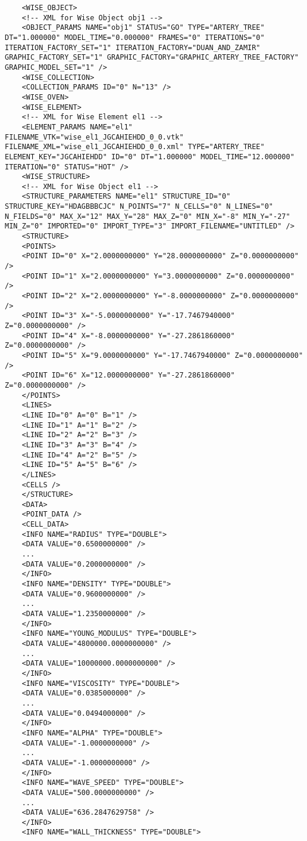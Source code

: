 \begin{appendices}
	\lstset{language=XML}
	\begin{lstlisting}
	<WISE_OBJECT>
	<!-- XML for Wise Object obj1 -->
	<OBJECT_PARAMS NAME="obj1" STATUS="GO" TYPE="ARTERY_TREE" DT="1.000000" MODEL_TIME="0.000000" FRAMES="0" ITERATIONS="0" ITERATION_FACTORY_SET="1" ITERATION_FACTORY="DUAN_AND_ZAMIR" GRAPHIC_FACTORY_SET="1" GRAPHIC_FACTORY="GRAPHIC_ARTERY_TREE_FACTORY" GRAPHIC_MODEL_SET="1" />
	<WISE_COLLECTION>
	<COLLECTION_PARAMS ID="0" N="13" />
	<WISE_OVEN>
	<WISE_ELEMENT>
	<!-- XML for Wise Element el1 -->
	<ELEMENT_PARAMS NAME="el1" FILENAME_VTK="wise_el1_JGCAHIEHDD_0_0.vtk" FILENAME_XML="wise_el1_JGCAHIEHDD_0_0.xml" TYPE="ARTERY_TREE" ELEMENT_KEY="JGCAHIEHDD" ID="0" DT="1.000000" MODEL_TIME="12.000000" ITERATION="0" STATUS="HOT" />
	<WISE_STRUCTURE>
	<!-- XML for Wise Object el1 -->
	<STRUCTURE_PARAMETERS NAME="el1" STRUCTURE_ID="0" STRUCTURE_KEY="HDAGBBBCJC" N_POINTS="7" N_CELLS="0" N_LINES="0" N_FIELDS="0" MAX_X="12" MAX_Y="28" MAX_Z="0" MIN_X="-8" MIN_Y="-27" MIN_Z="0" IMPORTED="0" IMPORT_TYPE="3" IMPORT_FILENAME="UNTITLED" />
	<STRUCTURE>
	<POINTS>
	<POINT ID="0" X="2.0000000000" Y="28.0000000000" Z="0.0000000000" />
	<POINT ID="1" X="2.0000000000" Y="3.0000000000" Z="0.0000000000" />
	<POINT ID="2" X="2.0000000000" Y="-8.0000000000" Z="0.0000000000" />
	<POINT ID="3" X="-5.0000000000" Y="-17.7467940000" Z="0.0000000000" />
	<POINT ID="4" X="-8.0000000000" Y="-27.2861860000" Z="0.0000000000" />
	<POINT ID="5" X="9.0000000000" Y="-17.7467940000" Z="0.0000000000" />
	<POINT ID="6" X="12.0000000000" Y="-27.2861860000" Z="0.0000000000" />
	</POINTS>
	<LINES>
	<LINE ID="0" A="0" B="1" />
	<LINE ID="1" A="1" B="2" />
	<LINE ID="2" A="2" B="3" />
	<LINE ID="3" A="3" B="4" />
	<LINE ID="4" A="2" B="5" />
	<LINE ID="5" A="5" B="6" />
	</LINES>
	<CELLS />
	</STRUCTURE>
	<DATA>
	<POINT_DATA />
	<CELL_DATA>
	<INFO NAME="RADIUS" TYPE="DOUBLE">
	<DATA VALUE="0.6500000000" />
	...
	<DATA VALUE="0.2000000000" />
	</INFO>
	<INFO NAME="DENSITY" TYPE="DOUBLE">
	<DATA VALUE="0.9600000000" />
	...
	<DATA VALUE="1.2350000000" />
	</INFO>
	<INFO NAME="YOUNG_MODULUS" TYPE="DOUBLE">
	<DATA VALUE="4800000.0000000000" />
	...
	<DATA VALUE="10000000.0000000000" />
	</INFO>
	<INFO NAME="VISCOSITY" TYPE="DOUBLE">
	<DATA VALUE="0.0385000000" />
	...
	<DATA VALUE="0.0494000000" />
	</INFO>
	<INFO NAME="ALPHA" TYPE="DOUBLE">
	<DATA VALUE="-1.0000000000" />
	...
	<DATA VALUE="-1.0000000000" />
	</INFO>
	<INFO NAME="WAVE_SPEED" TYPE="DOUBLE">
	<DATA VALUE="500.0000000000" />
	...
	<DATA VALUE="636.2847629758" />
	</INFO>
	<INFO NAME="WALL_THICKNESS" TYPE="DOUBLE">

\end{lstlisting}
\end{appendices}
